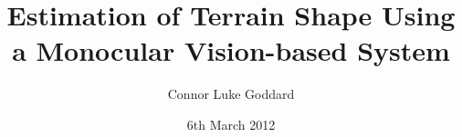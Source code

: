 
\title{Estimation of Terrain Shape Using a Monocular Vision-based System}

\author{Connor Luke Goddard}




\date{6th March 2012} %




\maketitle



